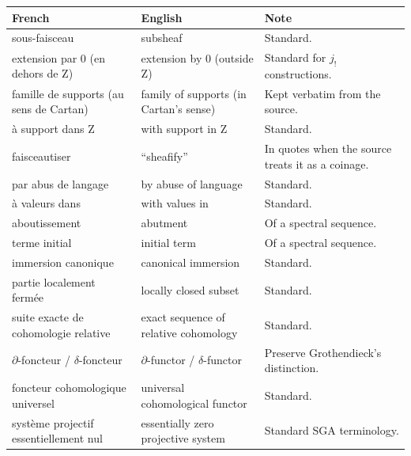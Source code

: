 \documentclass[
  11pt,
  a4paper,
]{book}
\newcounter{none} %
\begin{document}
{\def\LTcaptype{none} %
\begin{longtable}[]{@{}
  >{\raggedright\arraybackslash}p{}
  >{\raggedright\arraybackslash}p{}
  >{\raggedright\arraybackslash}p{}@{}}
\toprule\noalign{}
\begin{minipage}[b]{\linewidth}\raggedright
French
\end{minipage} & \begin{minipage}[b]{\linewidth}\raggedright
English
\end{minipage} & \begin{minipage}[b]{\linewidth}\raggedright
Note
\end{minipage} \\
\midrule\noalign{}
\endhead
\bottomrule\noalign{}
\endlastfoot
sous-faisceau & subsheaf & Standard. \\
extension par 0 (en dehors de Z) & extension by 0 (outside Z) & Standard
for \(j_{!}\) constructions. \\
famille de supports (au sens de Cartan) & family of supports (in
Cartan's sense) & Kept verbatim from the source. \\
à support dans Z & with support in Z & Standard. \\
faisceautiser & ``sheafify'' & In quotes when the source treats it as a
coinage. \\
par abus de langage & by abuse of language & Standard. \\
à valeurs dans & with values in & Standard. \\
aboutissement & abutment & Of a spectral sequence. \\
terme initial & initial term & Of a spectral sequence. \\
immersion canonique & canonical immersion & Standard. \\
partie localement fermée & locally closed subset & Standard. \\
suite exacte de cohomologie relative & exact sequence of relative
cohomology & Standard. \\
\(\partial\)-foncteur / \(\delta\)-foncteur & \(\partial\)-functor /
\(\delta\)-functor & Preserve Grothendieck's distinction. \\
foncteur cohomologique universel & universal cohomological functor &
Standard. \\
système projectif essentiellement nul & essentially zero projective
system & Standard SGA terminology. \\

\end{longtable}}
\end{document}

